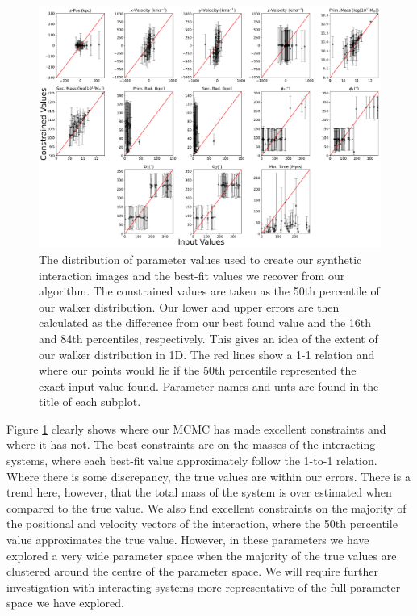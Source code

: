 \begin{figure}
    \centering
    \includegraphics[width=\textwidth]{Chapter1/figures/51_51.pdf}
    \caption[The distribution of parameter values used to create our synthetic interaction images and the best-fit values we recover from our algorithm.]{The distribution of parameter values used to create our synthetic interaction images and the best-fit values we recover from our algorithm. The constrained values are taken as the 50th percentile of our walker distribution. Our lower and upper errors are then calculated as the difference from our best found value and the 16th and 84th percentiles, respectively. This gives an idea of the extent of our walker distribution in 1D. The red lines show a 1-1 relation and where our points would lie if the 50th percentile represented the exact input value found. Parameter names and unts are found in the title of each subplot.}
    \label{fig:true-found-parameters}
\end{figure}

Figure \ref{fig:true-found-parameters} clearly shows where our MCMC has made excellent constraints and where it has not. The best constraints are on the masses of the interacting systems, where each best-fit value approximately follow the 1-to-1 relation. Where there is some discrepancy, the true values are within our errors. There is a trend here, however, that the total mass of the system is over estimated when compared to the true value. We also find excellent constraints on the majority of the positional and velocity vectors of the interaction, where the 50th percentile value approximates the true value. However, in these parameters we have explored a very wide parameter space when the majority of the true values are clustered around the centre of the parameter space. We will require further investigation with interacting systems more representative of the full parameter space we have explored. 

